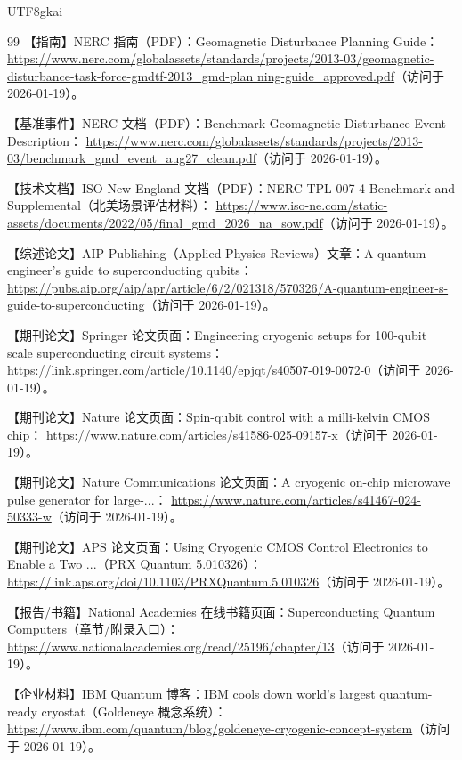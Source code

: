 \documentclass[12pt]{article}
\begin{document}
\begin{CJK*}{UTF8}{gkai}
\begin{thebibliography}{99}
【指南】NERC 指南（PDF）：Geomagnetic Disturbance Planning Guide：
\url{https://www.nerc.com/globalassets/standards/projects/2013-03/geomagnetic-disturbance-task-force-gmdtf-2013_gmd-plan
  ning-guide_approved.pdf}（访问于 2026-01-19）。

【基准事件】NERC 文档（PDF）：Benchmark Geomagnetic Disturbance Event Description：
\url{https://www.nerc.com/globalassets/standards/projects/2013-03/benchmark_gmd_event_aug27_clean.pdf}（访问于 2026-01-19）。

【技术文档】ISO New England 文档（PDF）：NERC TPL-007-4 Benchmark and Supplemental（北美场景评估材料）：
\url{https://www.iso-ne.com/static-assets/documents/2022/05/final_gmd_2026_na_sow.pdf}（访问于 2026-01-19）。

【综述论文】AIP Publishing（Applied Physics Reviews）文章：A quantum engineer's guide to superconducting qubits：
\url{https://pubs.aip.org/aip/apr/article/6/2/021318/570326/A-quantum-engineer-s-guide-to-superconducting}（访问于
  2026-01-19）。

【期刊论文】Springer 论文页面：Engineering cryogenic setups for 100-qubit scale superconducting circuit systems：
\url{https://link.springer.com/article/10.1140/epjqt/s40507-019-0072-0}（访问于 2026-01-19）。

【期刊论文】Nature 论文页面：Spin-qubit control with a milli-kelvin CMOS chip：
\url{https://www.nature.com/articles/s41586-025-09157-x}（访问于 2026-01-19）。

【期刊论文】Nature Communications 论文页面：A cryogenic on-chip microwave pulse generator for large-...：
\url{https://www.nature.com/articles/s41467-024-50333-w}（访问于 2026-01-19）。

【期刊论文】APS 论文页面：Using Cryogenic CMOS Control Electronics to Enable a Two ...（PRX Quantum 5.010326）：
\url{https://link.aps.org/doi/10.1103/PRXQuantum.5.010326}（访问于 2026-01-19）。

【报告/书籍】National Academies 在线书籍页面：Superconducting Quantum Computers（章节/附录入口）：
\url{https://www.nationalacademies.org/read/25196/chapter/13}（访问于 2026-01-19）。

【企业材料】IBM Quantum 博客：IBM cools down world's largest quantum-ready cryostat（Goldeneye 概念系统）：
\url{https://www.ibm.com/quantum/blog/goldeneye-cryogenic-concept-system}（访问于 2026-01-19）。


\end{thebibliography}
\end{CJK*}
\end{document}
